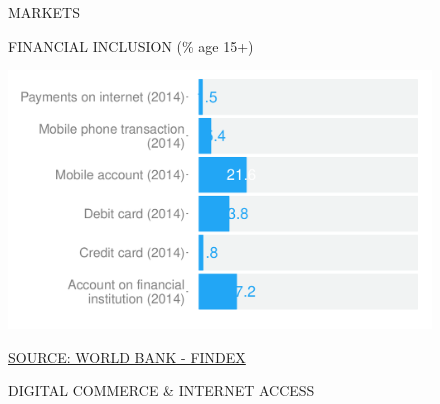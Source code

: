 \documentclass{article}\usepackage[]{graphicx}\usepackage[]{color}
\makeatletter
\def\maxwidth{ %
  \ifdim\Gin@nat@width>\linewidth
    \linewidth
  \else
    \Gin@nat@width
  \fi
}
\makeatother
\begin{document}
\begin{figure}
\begin{minipage}[c]{0.95\textwidth}
  \vspace{5ex}
  \begin{minipage}[b]{0.95\textwidth}
    \begin{flushleft}  
      \Large{\textcolor[HTML]{22A6F5}{MARKETS}}
    \end{flushleft}
    \begin{minipage}[c]{0.48\textwidth} %
      \small{\textcolor[HTML]{818181}{FINANCIAL INCLUSION \footnotesize(\% age 15+)}}


{\centering \includegraphics[width=\maxwidth]{figure/bar_chart_Markets-1} 

}



      \vspace*{-0.1cm} 
      \scriptsize{\href{http://www.worldbank.org/en/programs/globalfindex}{\textcolor[HTML]{22A6F5}{SOURCE: WORLD BANK - FINDEX}}}
    \end{minipage}
    \begin{minipage}[c]{0.49\textwidth} %
      \small{\textcolor[HTML]{818181}{DIGITAL COMMERCE \& INTERNET ACCESS}}
      \vspace{1ex}



\end{minipage}
\end{minipage}
\end{minipage}
\end{figure}
\end{document}
